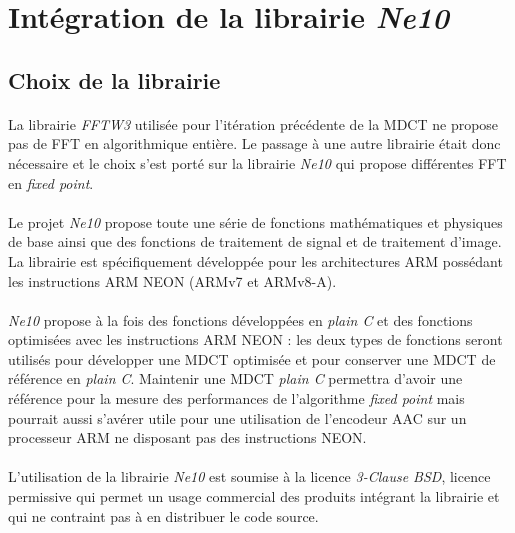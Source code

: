 \documentclass{article}
\begin{document}
    \newpage
    \section{Intégration de la librairie \emph{Ne10}}
    \subsection{Choix de la librairie}
    \paragraph{}
    La librairie \emph{FFTW3} utilisée pour l'itération précédente de la MDCT ne propose pas de FFT en algorithmique entière. Le passage à une autre librairie était donc nécessaire et le choix s'est porté sur la librairie \emph{Ne10} qui propose différentes FFT en \emph{fixed point}.

    \paragraph{}
    Le projet \emph{Ne10} propose toute une série de fonctions mathématiques et physiques de base ainsi que des fonctions de traitement de signal et de traitement d'image. La librairie est spécifiquement développée pour les architectures ARM possédant les instructions ARM NEON (ARMv7 et ARMv8-A)\cite{Ne10}.

    \paragraph{}
    \emph{Ne10} propose à la fois des fonctions développées en \emph{plain C} et des fonctions optimisées avec les instructions ARM NEON : les deux types de fonctions seront utilisés pour développer une MDCT optimisée et pour conserver une MDCT de référence en \emph{plain C}. Maintenir une MDCT \emph{plain C} permettra d'avoir une référence pour la mesure des performances de l'algorithme \emph{fixed point} mais pourrait aussi s'avérer utile pour une utilisation de l'encodeur AAC sur un processeur ARM ne disposant pas des instructions NEON.

    \paragraph{}
    L'utilisation de la librairie \emph{Ne10} est soumise à la licence \emph{3-Clause BSD}, licence permissive qui permet un usage commercial des produits intégrant la librairie et qui ne contraint pas à en distribuer le code source\cite{BSD}.
\end{document}
